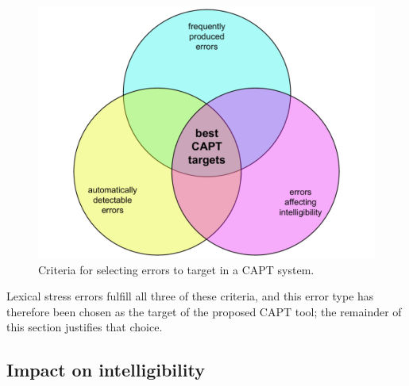 		\begin{figure}[htb]
			\centering
			\includegraphics[width=.7\textwidth]{img/error-venn}
			\caption{Criteria for selecting errors to target in a CAPT system.}
			\label{fig:errors}
		\end{figure}

	Lexical stress errors  fulfill all three of these criteria, and this error type has therefore been chosen as the target of the proposed CAPT tool; the remainder of this section justifies that choice. 
%	
%	
%
%	 

%
%	
%
		\subsection{Impact on intelligibility}
		\label{sec:targeting:intelligibility}

